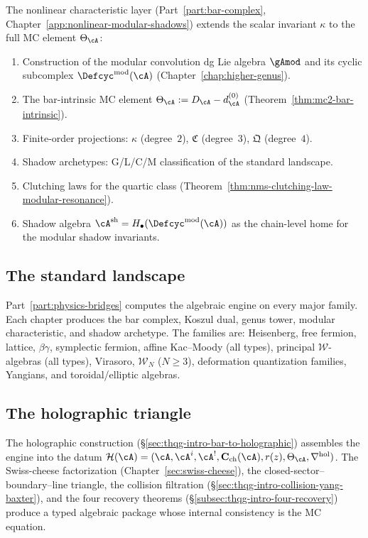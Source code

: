 The nonlinear characteristic layer (Part~\ref{part:bar-complex},
Chapter~\ref{app:nonlinear-modular-shadows}) extends the scalar
invariant $\kappa$ to the full MC element $\Theta_\cA$:
\begin{enumerate}[label=\textup{(\roman*)}]
\item Construction of the modular convolution dg Lie algebra
 $\gAmod$ and its cyclic subcomplex $\Defcyc^{\mathrm{mod}}(\cA)$
 (Chapter~\ref{chap:higher-genus}).
\item The bar-intrinsic MC element
 $\Theta_\cA := D_\cA - d_\cA^{(0)}$
 (Theorem~\ref{thm:mc2-bar-intrinsic}).
\item Finite-order projections: $\kappa$ (degree~$2$),
 $\mathfrak{C}$ (degree~$3$), $\mathfrak{Q}$ (degree~$4$).
\item Shadow archetypes: G/L/C/M classification of the standard
 landscape.
\item Clutching laws for the quartic class
 (Theorem~\ref{thm:nms-clutching-law-modular-resonance}).
\item Shadow algebra $\cA^{\mathrm{sh}} = H_\bullet(\Defcyc^{\mathrm{mod}}(\cA))$
 as the chain-level home for the modular shadow invariants.
\end{enumerate}

\subsection{The standard landscape}
\label{subsec:thqg-intro-guide-landscape}

Part~\ref{part:physics-bridges} computes the algebraic engine on every major family. Each
chapter produces the bar complex, Koszul dual, genus tower, modular
characteristic, and shadow archetype. The families are:
Heisenberg, free fermion, lattice, $\beta\gamma$, symplectic fermion,
affine Kac--Moody (all types), principal $\mathcal{W}$-algebras
(all types), Virasoro, $\mathcal{W}_N$ ($N \ge 3$), deformation
quantization families, Yangians, and toroidal/elliptic algebras.

\subsection{The holographic triangle}
\label{subsec:thqg-intro-guide-triangle}

The holographic construction
(\S\ref{sec:thqg-intro-bar-to-holographic}) assembles the engine
into the datum
$\mathcal{H}(\cA)=(\cA,\cA^i,\cA^!,
\mathbf{C}_{\mathrm{ch}}(\cA),r(z),\Theta_\cA,
\nabla^{\mathrm{hol}})$. The Swiss-cheese
factorization (Chapter~\ref{sec:swiss-cheese}), the
closed-sector--boundary--line triangle, the collision filtration
(\S\ref{sec:thqg-intro-collision-yang-baxter}), and the four recovery
theorems (\S\ref{subsec:thqg-intro-four-recovery}) produce a typed
algebraic package whose internal consistency is the MC equation.

